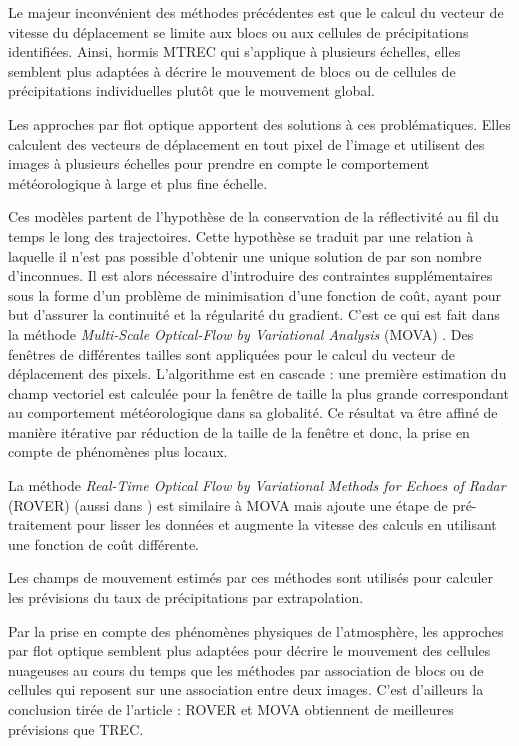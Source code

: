 \documentclass[12pt,a4paper,french]{article}
\begin{document}
Le majeur inconvénient des méthodes précédentes est que le calcul du vecteur de vitesse du déplacement se limite aux blocs ou aux cellules de précipitations identifiées. Ainsi, hormis MTREC qui s'applique à plusieurs échelles, elles semblent plus adaptées à décrire le mouvement de blocs ou de cellules de précipitations individuelles plutôt que le mouvement global. \newline

Les approches par flot optique apportent des solutions à ces problématiques. Elles calculent des vecteurs de déplacement en tout pixel de l'image et utilisent des images à plusieurs échelles pour prendre en compte le comportement météorologique à large et plus fine échelle. \cite{atmos8030048} \newline

Ces modèles partent de l'hypothèse de la conservation de la réflectivité au fil du temps le long des trajectoires. Cette hypothèse se traduit par une relation à laquelle il n'est pas possible d'obtenir une unique solution de par son nombre d'inconnues. Il est alors nécessaire d'introduire des contraintes supplémentaires sous la forme d'un problème de minimisation d'une fonction de coût, ayant pour but d'assurer la continuité et la régularité du gradient. C'est ce qui est fait dans la méthode \textit{Multi-Scale Optical-Flow by Variational Analysis} (MOVA) \cite{atmos8030048}. Des fenêtres de différentes tailles sont appliquées pour le calcul du vecteur de déplacement des pixels. L'algorithme est en cascade : une première estimation du champ vectoriel est calculée pour la fenêtre de taille la plus grande correspondant au comportement météorologique dans sa globalité. Ce résultat va être affiné de manière itérative par réduction de la taille de la fenêtre et donc, la prise en compte de phénomènes plus locaux. 

La méthode \textit{Real-Time Optical Flow by Variational Methods for Echoes of Radar} (ROVER) (aussi dans \cite{atmos8030048}) est similaire à MOVA mais ajoute une étape de pré-traitement pour lisser les données et augmente la vitesse des calculs en utilisant une fonction de coût différente.

Les champs de mouvement estimés par ces méthodes sont utilisés pour calculer les prévisions du taux de précipitations par extrapolation. 
\newline

Par la prise en compte des phénomènes physiques de l'atmosphère, les approches par flot optique semblent plus adaptées pour décrire le mouvement des cellules nuageuses au cours du temps que les méthodes par association de blocs ou de cellules qui reposent sur une association entre deux images. C'est d'ailleurs la conclusion tirée de l'article \cite{atmos8030048} : ROVER et MOVA obtiennent de meilleures prévisions que TREC.  
\end{document}
